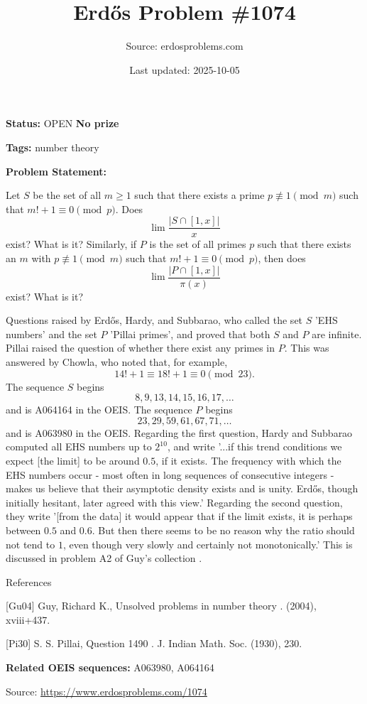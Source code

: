 \documentclass{article}
\title{Erd\H{o}s Problem \#1074}
\date{Last updated: 2025-10-05}
\author{Source: erdosproblems.com}
\begin{document}
\maketitle

\noindent\textbf{Status:} OPEN \quad \textbf{No prize}

\noindent\textbf{Tags:} number theory

\medskip

\noindent\textbf{Problem Statement:}

Let $S$ be the set of all $m\geq 1$ such that there exists a prime $p\not\equiv 1\pmod{m}$ such that $m!+1\equiv 0\pmod{p}$. Does\[\lim \frac{\lvert S\cap [1,x]\rvert}{x}\]exist? What is it? Similarly, if $P$ is the set of all primes $p$ such that there exists an $m$ with $p\not\equiv 1\pmod{m}$ such that $m!+1\equiv 0\pmod{p}$, then does\[\lim \frac{\lvert P\cap [1,x]\rvert}{\pi(x)}\]exist? What is it?




Questions raised by Erd\H{o}s, Hardy, and Subbarao, who called the set $S$ 'EHS numbers' and the set $P$ 'Pillai primes', and proved that both $S$ and $P$ are infinite. Pillai \cite{Pi30} raised the question of whether there exist any primes in $P$. This was answered by Chowla, who noted that, for example,\[14!+1\equiv 18!+1\equiv 0\pmod{23}.\]The sequence $S$ begins\[8,9,13,14,15,16,17,\ldots\]and is A064164 in the OEIS. The sequence $P$ begins\[23,29,59,61,67,71,\ldots\]and is A063980 in the OEIS. Regarding the first question, Hardy and Subbarao computed all EHS numbers up to $2^{10}$, and write '...if this trend conditions we expect [the limit] to be around $0.5$, if it exists. The frequency with which the EHS numbers occur - most often in long sequences of consecutive integers - makes us believe that their asymptotic density exists and is unity. Erd\H{o}s, though initially hesitant, later agreed with this view.' Regarding the second question, they write '[from the data] it would appear that if the limit exists, it is perhaps between $0.5$ and $0.6$. But then there seems to be no reason why the ratio should not tend to $1$, even though very slowly and certainly not monotonically.' This is discussed in problem A2 of Guy's collection \cite{Gu04}.




References

[Gu04] Guy, Richard K., Unsolved problems in number theory . (2004), xviii+437.

[Pi30] S. S. Pillai, Question 1490 . J. Indian Math. Soc. (1930), 230.

\noindent\textbf{Related OEIS sequences:} A063980, A064164


\bigskip
\noindent\small{Source: \url{https://www.erdosproblems.com/1074}}
\end{document}
